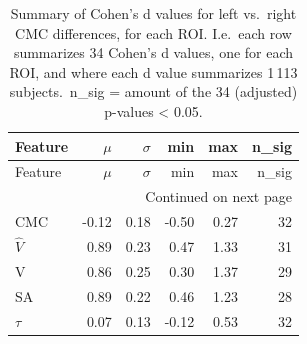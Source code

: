 \documentclass{article}
\begin{document}
\begin{longtable}{lrrrrr}
	\caption{Summary of Cohen's d values for left vs.\ right CMC differences, for each ROI\@. I.e.\ each row summarizes 34 Cohen's d values, one for each ROI, and where each d value summarizes 1\,113 subjects.\ n\_sig = amount of the 34 (adjusted) p-values < 0.05.} \label{tab:sex-lateral-ds} \\
	\toprule
	Feature & $\mu$ & $\sigma$ & min & max & n\_sig \\
	\midrule
	\endfirsthead
	\toprule
	Feature & $\mu$ & $\sigma$ & min & max & n\_sig \\
	\midrule
	\endhead
	\midrule
	\multicolumn{6}{r}{Continued on next page} \\
	\midrule
	\endfoot
	\bottomrule
	\endlastfoot
	$\text{CMC}$ & -0.12 & 0.18 & -0.50 & 0.27 & 32 \\*
	$\hat{V}$ & 0.89 & 0.23 & 0.47 & 1.33 & 31 \\*
	V & 0.86 & 0.25 & 0.30 & 1.37 & 29 \\*
	SA & 0.89 & 0.22 & 0.46 & 1.23 & 28 \\*
	$\tau$ & 0.07 & 0.13 & -0.12 & 0.53 & 32 \\*
\end{longtable}
\end{document}
